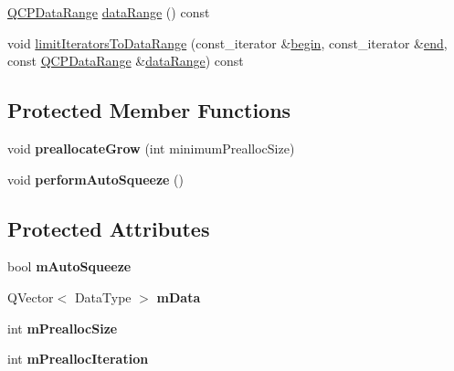 \begin{DoxyCompactItemize}
\item 
\hyperlink{class_q_c_p_data_range}{Q\+C\+P\+Data\+Range} \hyperlink{class_q_c_p_data_container_aece90eeb2ba8d3c46d3d94023630fbc7}{data\+Range} () const
\item 
void \hyperlink{class_q_c_p_data_container_aa1b36f5ae86a5a5a0b92141d3a0945c4}{limit\+Iterators\+To\+Data\+Range} (const\+\_\+iterator \&\hyperlink{class_q_c_p_data_container_a80032518413ab8f418f7c81182fd06cb}{begin}, const\+\_\+iterator \&\hyperlink{class_q_c_p_data_container_acf66dfad83fe041380f5e0491e7676f2}{end}, const \hyperlink{class_q_c_p_data_range}{Q\+C\+P\+Data\+Range} \&\hyperlink{class_q_c_p_data_container_aece90eeb2ba8d3c46d3d94023630fbc7}{data\+Range}) const
\end{DoxyCompactItemize}
\subsection*{Protected Member Functions}
\begin{DoxyCompactItemize}
\item 
\mbox{\label{class_q_c_p_data_container_aae8cdb2bcc3b900ec22f26df3e7d67c7}} 
void {\bfseries preallocate\+Grow} (int minimum\+Prealloc\+Size)
\item 
\mbox{\label{class_q_c_p_data_container_a83c25ac14be1c920df85e797ee75c982}} 
void {\bfseries perform\+Auto\+Squeeze} ()
\end{DoxyCompactItemize}
\subsection*{Protected Attributes}
\begin{DoxyCompactItemize}
\item 
\mbox{\label{class_q_c_p_data_container_aae64c517d64511ad7a81ff8ee7b29147}} 
bool {\bfseries m\+Auto\+Squeeze}
\item 
\mbox{\label{class_q_c_p_data_container_a74906b4da829849c4062b5337c72585d}} 
Q\+Vector$<$ Data\+Type $>$ {\bfseries m\+Data}
\item 
\mbox{\label{class_q_c_p_data_container_a3554d3ad00e69f7ce057efa00ea6f4b2}} 
int {\bfseries m\+Prealloc\+Size}
\item 
\mbox{\label{class_q_c_p_data_container_ab2115bf023c29691f441eaf1889de84a}} 
int {\bfseries m\+Prealloc\+Iteration}
\end{DoxyCompactItemize}

